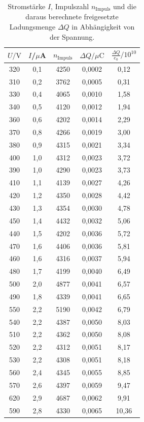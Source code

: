 \begin{table}
  \caption{Stromstärke $I$, Impulszahl $n_\mathrm{Impuls}$ und die daraus berechnete freigesetzte Ladungsmenge $\Delta Q$ in Abhängigkeit von der Spannung.}
  \centering
  \label{tab:frei-ladung}
  \begin{tabular}{c c c c c}
    \toprule
   $U/\si{\volt}$ & $I$/$\mu$\si{\ampere} & $n_\mathrm{Impuls}$ & $\Delta Q /\mu \si{\coulomb}$ & $\frac{\Delta Q}{e_0}/10^{10}$\\
    \midrule
320	& 0,1	& 4250 & 0,0002 & 0,12 \\
310	& 0,2	& 3762 & 0,0005 & 0,31\\
330	& 0,4	& 4065 & 0,0010 & 1,58 \\
340	& 0,5	& 4120 & 0,0012 & 1,94 \\
360	& 0,6	& 4202 & 0,0014 & 2,29 \\
370	& 0,8	& 4266 & 0,0019 & 3,00 \\
380	& 0,9	& 4315 & 0,0021 & 3,34 \\
400	& 1,0	& 4312 & 0,0023 & 3,72 \\
390	& 1,0	& 4290 & 0,0023 & 3,73 \\
410	& 1,1	& 4139 & 0,0027 & 4,26 \\
420	& 1,2	& 4350 & 0,0028 & 4,42 \\
430	& 1,3	& 4354 & 0,0030 & 4,78 \\
450	& 1,4	& 4432 & 0,0032 & 5,06 \\
440	& 1,5	& 4202 & 0,0036 & 5,72 \\
470	& 1,6	& 4406 & 0,0036 & 5,81 \\
460	& 1,6	& 4316 & 0,0037 & 5,94 \\
480	& 1,7	& 4199 & 0,0040 & 6,49 \\
500	& 2,0	& 4877 & 0,0041 & 6,57 \\
490	& 1,8	& 4339 & 0,0041 & 6,65 \\
550	& 2,2	& 5190 & 0,0042 & 6,79 \\
540	& 2,2	& 4387 & 0,0050 & 8,03 \\
510	& 2,2	& 4362 & 0,0050 & 8,08 \\
520	& 2,2	& 4312 & 0,0051 & 8,17 \\
530	& 2,2	& 4308 & 0,0051 & 8,18 \\
560	& 2,4	& 4345 & 0,0055 & 8,85 \\
570	& 2,6	& 4397 & 0,0059 & 9,47 \\
620	& 2,9	& 4687 & 0,0062 & 9,91 \\
590	& 2,8	& 4330 & 0,0065 & 10,36 \\

\end{tabular}
\end{table}
